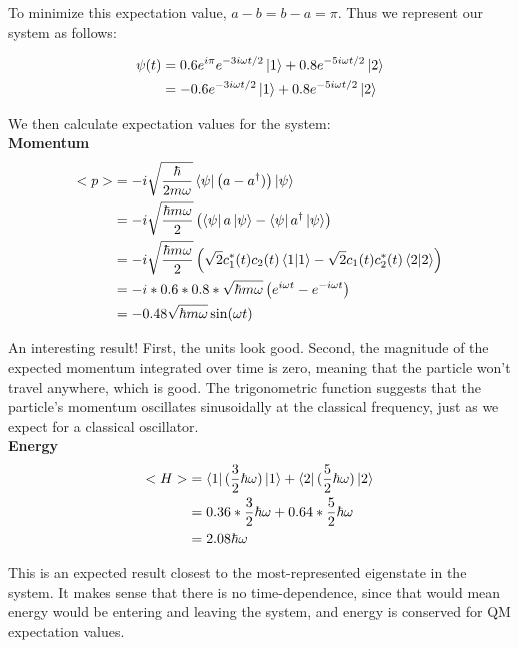 \documentclass[10pt]{article} %
\begin{document}
To minimize this expectation value, $a-b = b-a = \pi$. Thus we represent our system as follows:

\begin{align*}
  \psi(t) &= 0.6e^{i\pi}e^{-3i\omega t/2}\ket{1} + 0.8e^{-5i\omega t/2}\ket{2}\\
  &= -0.6e^{-3i\omega t/2}\ket{1} + 0.8e^{-5i\omega t/2}\ket{2}\\
\end{align*}

We then calculate expectation values for the system:\\

\textbf{Momentum}
\begin{align*}
  <p> &= -i\sqrt{\frac{\hbar}{2m\omega}}\bra{\psi}\left(a - a^\dagger)\right)\ket{\psi}\\
  &= -i\sqrt{\frac{\hbar m\omega}{2}}\left(\bra{\psi}a\ket{\psi}
  - \bra{\psi}a^\dagger\ket{\psi}\right)\\
  &= -i\sqrt{\frac{\hbar m\omega}{2}}\left(\sqrt{2}c_1^*(t)c_2(t)\bra{1}\ket{1}
  - \sqrt{2}c_1(t)c_2^*(t)\bra{2}\ket{2}\right)\\
  &= -i*0.6*0.8*\sqrt{\hbar m\omega}\left(e^{i\omega t} - e^{-i\omega t}\right)\\
  &= -0.48\sqrt{\hbar m\omega}\sin(\omega t)\\
\end{align*}

An interesting result! First, the units look good. Second, the magnitude of the expected momentum
integrated over time is zero, meaning that the particle won't travel anywhere, which is good. The
trigonometric function suggests that the particle's momentum oscillates sinusoidally at the
classical frequency, just as we expect for a classical oscillator.\\

\textbf{Energy}
\begin{align*}
  <H> &= \bra{1}(\frac{3}{2}\hbar\omega)\ket{1} + \bra{2}(\frac{5}{2}\hbar\omega)\ket{2}\\
  &= 0.36 * \frac{3}{2}\hbar\omega + 0.64 * \frac{5}{2}\hbar\omega\\
  &= 2.08\hbar\omega\\
\end{align*}

This is an expected result closest to the most-represented eigenstate in the system. It makes sense
that there is no time-dependence, since that would mean energy would be entering and leaving the
system, and energy is conserved for QM expectation values.
\end{document}
